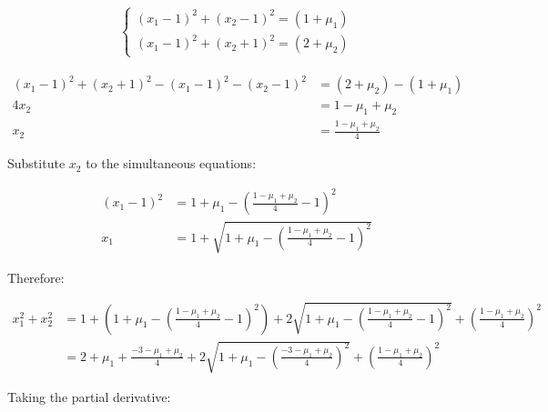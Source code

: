 \documentclass[11pt, letterpaper, titlepage]{article}
\begin{document}
\begin{enumerate}
\begin{enumerate}
        \begin{gather*}
                \begin{cases}
                (x_1 - 1)^2 + (x_2 - 1)^2 = (1 + \mu_1) \\
                (x_1 - 1)^2 + (x_2 + 1)^2 = (2 + \mu_2)
                \end{cases}
            \end{gather*}
            
        \begin{equation*}
            \begin{aligned}
                (x_1 - 1)^2 + (x_2 + 1)^2 - (x_1 - 1)^2 - (x_2 - 1)^2 &= (2 + \mu_2) - (1 + \mu_1) \\
                4 x_2 &= 1 - \mu_1 + \mu_2 \\
                x_2 &= \frac{1 - \mu_1 + \mu_2}{4}
            \end{aligned}
        \end{equation*}
        
        Substitute $x_2$ to the simultaneous equations:
        
        \begin{equation*}
            \begin{aligned}
                (x_1 - 1)^2 &= 1 + \mu_1 - (\frac{1 - \mu_1 + \mu_2}{4} - 1)^2 \\
                x_1 &= 1 + \sqrt{1 + \mu_1 - (\frac{1 - \mu_1 + \mu_2}{4} - 1)^2}
            \end{aligned}
        \end{equation*}
        
        Therefore:
        
        \begin{equation*}
            \begin{aligned}
                x_1^2 + x_2^2 &= 1 + (1 + \mu_1 - (\frac{1 - \mu_1 + \mu_2}{4} - 1)^2) + 2 \sqrt{1 + \mu_1 - (\frac{1 - \mu_1 + \mu_2}{4} - 1)^2} + (\frac{1 - \mu_1 + \mu_2}{4})^2 \\
                &= 2 + \mu_1 + \frac{- 3 - \mu_1 + \mu_2}{4} + 2 \sqrt{1 + \mu_1 - (\frac{- 3 - \mu_1 + \mu_2}{4})^2} + (\frac{1 - \mu_1 + \mu_2}{4})^2
            \end{aligned}
        \end{equation*}
        
        Taking the partial derivative:
        

\end{enumerate}
\end{enumerate}
\end{document}
